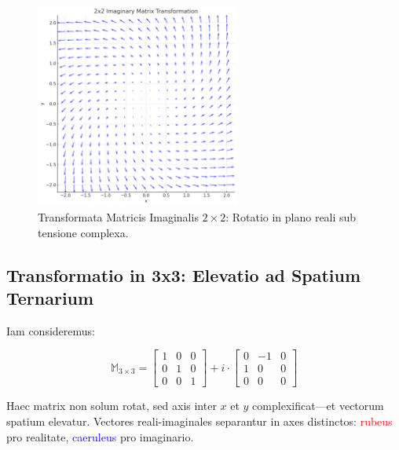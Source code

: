 \begin{figure}[H]
  \centering
  \includegraphics[width=0.6\textwidth]{images/output(2).png}
  \caption{Transformata Matricis Imaginalis \(2 \times 2\): Rotatio in plano reali sub tensione complexa.}
\end{figure}

\subsection*{Transformatio in 3x3: Elevatio ad Spatium Ternarium}

Iam consideremus:

\[
\mathbb{M}_{3 \times 3} =
\begin{bmatrix}
1 & 0 & 0 \\
0 & 1 & 0 \\
0 & 0 & 1
\end{bmatrix}
+ i \cdot
\begin{bmatrix}
0 & -1 & 0 \\
1 & 0 & 0 \\
0 & 0 & 0
\end{bmatrix}
\]

Haec matrix non solum rotat, sed axis inter \( x \) et \( y \) complexificat—et vectorum spatium elevatur. Vectores reali-imaginales separantur in axes distinctos: \textcolor{red}{rubeus} pro realitate, \textcolor{blue}{caeruleus} pro imaginario.

